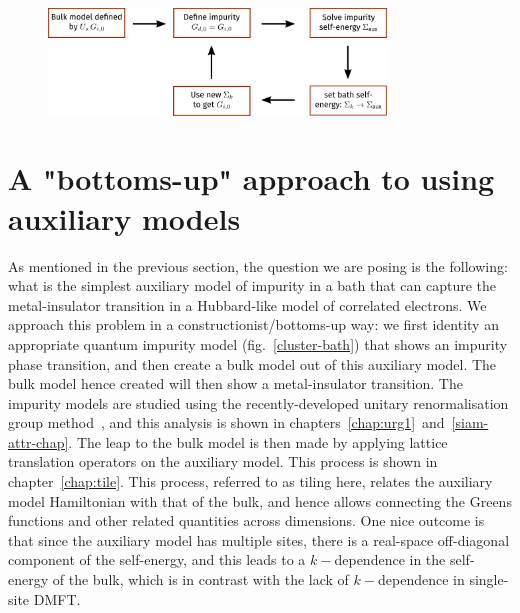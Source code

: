 \documentclass[10pt]{report}
\numberwithin{equation}{section}
\begin{document}
\begin{figure}[htpb]
	\centering
	\includegraphics[width=0.8\textwidth]{../figures/dmft.pdf}
\end{figure}


\section{A "bottoms-up" approach to using auxiliary models}
As mentioned in the previous section, the question we are posing is the following: what is the simplest auxiliary model of impurity in a bath that can capture the metal-insulator transition in a Hubbard-like model of correlated electrons. We approach this problem in a constructionist/bottoms-up way: we first identity an appropriate quantum impurity model (fig.~\ref{cluster-bath}) that shows an impurity phase transition, and then create a bulk model out of this auxiliary model. The bulk model hence created will then show a metal-insulator transition. The impurity models are studied using the recently-developed unitary renormalisation group method~\cite{anirbanmott1,anirbanmott2,anirbanurg1,anirbanurg2,siddharthacpi,santanukagome}, and this analysis is shown in chapters~\ref{chap:urg1}~and~\ref{siam-attr-chap}. The leap to the bulk model is then made by applying lattice translation operators on the auxiliary model. This process is shown in chapter~\ref{chap:tile}. This process, referred to as tiling here, relates the auxiliary model Hamiltonian with that of the bulk, and hence allows connecting the Greens functions and other related quantities across dimensions. One nice outcome is that since the auxiliary model has multiple sites, there is a real-space off-diagonal component of the self-energy, and this leads to a \(k-\)dependence in the self-energy of the bulk, which is in contrast with the lack of \(k-\)dependence in single-site DMFT.  
\end{document}
